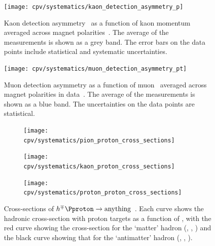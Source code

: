 \begin{figure}
  \centering
  \texttt{[image: cpv/systematics/kaon\_detection\_asymmetry\_p]}
  \caption{%
    Kaon detection asymmetry \ADKpi\ as a function of kaon momentum averaged 
    across magnet polarities~\cite{Aaij:2014gsa}.
    The average of the measurements is shown as a grey band.
    The error bars on the data points include statistical and systematic 
    uncertainties.
  }
  \label{fig:cpv:syst:asym:kaon}
\end{figure}

\begin{table}
  \centering
  \caption{%
    Kaon detection asymmetries \ADKpi\ in bins of kaon 
    momentum~\cite{Aaij:2014gsa}.
  }
  \label{tab:cpv:syst:asym:kaon}
  
\end{table}

\begin{figure}
  \centering
  \texttt{[image: cpv/systematics/muon\_detection\_asymmetry\_pt]}
  \caption{%
    Muon detection asymmetry as a function of muon \pT\ averaged 
    across magnet polarities in  data~\cite{Stahl:2010261}.
    The average of the measurements is shown as a blue band.
    The uncertainties on the data points are statistical.
  }
  \label{fig:cpv:syst:asym:muon}
\end{figure}

\begin{table}
  \centering
  \caption{%
    Muon detection asymmetries in bins of muon \pT measured using  
    (2011) and \SI{8}{\TeV} (2012)~\cite{Stahl:2010261}.
  }
  \label{tab:cpv:syst:asym:muon}
  
\end{table}

\begin{figure}
  \begin{subfigure}{0.5\textwidth}
    \centering
    \texttt{[image: cpv/systematics/pion\_proton\_cross\_sections]}
    \caption{}
    \label{fig:cpv:syst:asym:xsecs:pion}
  \end{subfigure}
  \begin{subfigure}{0.5\textwidth}
    \centering
    \texttt{[image: cpv/systematics/kaon\_proton\_cross\_sections]}
    \caption{}
    \label{fig:cpv:syst:asym:xsecs:kaon}
  \end{subfigure}
  \begin{subfigure}{0.5\textwidth}
    \centering
    \texttt{[image: cpv/systematics/proton\_proton\_cross\_sections]}
    \caption{}
    \label{fig:cpv:syst:asym:xsecs:proton}
  \end{subfigure}
  \caption{%
    Cross-sections of $h^{\mp}\Pproton \to \text{anything}$~\cite{PDG2014}.
    Each curve shows the hadronic cross-section with proton targets as a 
    function of \sqrts, with the red curve showing the cross-section for the 
    `matter' hadron (\PKplus, \Ppiplus, \Pproton) and the black curve showing 
    that for the `antimatter' hadron (\PKminus, \Ppiminus, \APproton).
  }
  \label{fig:cpv:syst:asym:xsecs}
\end{figure}

